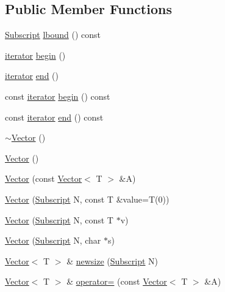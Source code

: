 \subsection*{Public Member Functions}
\begin{DoxyCompactItemize}
\item 
\hyperlink{vec_8h_a2dedc729e88b5f13d52bc9aeeda264dc}{Subscript} \hyperlink{class_vector_a1572f8f1f51c91ca1244ad4007554419}{lbound} () const 
\item 
\hyperlink{class_vector_a30c203480dfd28a0f1fde5c08a68db94}{iterator} \hyperlink{class_vector_a466e8c045ea10d62c28b689888e9fe5a}{begin} ()
\item 
\hyperlink{class_vector_a30c203480dfd28a0f1fde5c08a68db94}{iterator} \hyperlink{class_vector_ae288fa619188bff101d5300b8aaf9a90}{end} ()
\item 
const \hyperlink{class_vector_a30c203480dfd28a0f1fde5c08a68db94}{iterator} \hyperlink{class_vector_ae788da34b714381b90142b195d62fd42}{begin} () const 
\item 
const \hyperlink{class_vector_a30c203480dfd28a0f1fde5c08a68db94}{iterator} \hyperlink{class_vector_a89b541445053d883ad244ba5a7e49fbb}{end} () const 
\item 
\hyperlink{class_vector_afd524fac19e6d3d69db5198ffe2952b0}{$\sim$\+Vector} ()
\item 
\hyperlink{class_vector_a39d6069675db4ecfc1ab81d440da759a}{Vector} ()
\item 
\hyperlink{class_vector_a1687554d658dc6cf062f5a9c47b2bfdc}{Vector} (const \hyperlink{class_vector}{Vector}$<$ T $>$ \&A)
\item 
\hyperlink{class_vector_a82501ca0ed78bc60797e61429988ba5f}{Vector} (\hyperlink{vec_8h_a2dedc729e88b5f13d52bc9aeeda264dc}{Subscript} N, const T \&value=T(0))
\item 
\hyperlink{class_vector_aeb3281a2f62d066cecdd8d78f5758e9a}{Vector} (\hyperlink{vec_8h_a2dedc729e88b5f13d52bc9aeeda264dc}{Subscript} N, const T $\ast$v)
\item 
\hyperlink{class_vector_ac7cb3f96e3adb4bd02d075480849dd43}{Vector} (\hyperlink{vec_8h_a2dedc729e88b5f13d52bc9aeeda264dc}{Subscript} N, char $\ast$s)
\item 
\hyperlink{class_vector}{Vector}$<$ T $>$ \& \hyperlink{class_vector_a98e75f046dc4ed19e833c1fd79d7a15b}{newsize} (\hyperlink{vec_8h_a2dedc729e88b5f13d52bc9aeeda264dc}{Subscript} N)
\item 
\hyperlink{class_vector}{Vector}$<$ T $>$ \& \hyperlink{class_vector_a7b134c71c1f210b7df5c8025780e9740}{operator=} (const \hyperlink{class_vector}{Vector}$<$ T $>$ \&A)

\end{DoxyCompactItemize}
